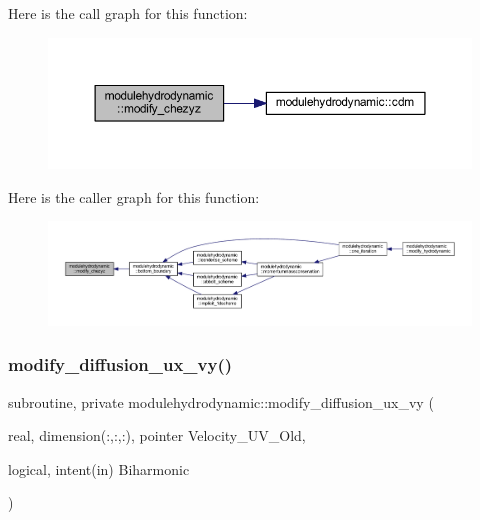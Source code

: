Here is the call graph for this function\+:\nopagebreak
\begin{figure}[H]
\begin{center}
\leavevmode
\includegraphics[width=350pt]{namespacemodulehydrodynamic_a4b8bde093197fe02063699036c456839_cgraph}
\end{center}
\end{figure}
Here is the caller graph for this function\+:\nopagebreak
\begin{figure}[H]
\begin{center}
\leavevmode
\includegraphics[width=350pt]{namespacemodulehydrodynamic_a4b8bde093197fe02063699036c456839_icgraph}
\end{center}
\end{figure}
\mbox{\label{namespacemodulehydrodynamic_a1961c3204e40bc45322afca99ce797ea}} 
\subsubsection{\texorpdfstring{modify\+\_\+diffusion\+\_\+ux\+\_\+vy()}{modify\_diffusion\_ux\_vy()}}
{\footnotesize\ttfamily subroutine, private modulehydrodynamic\+::modify\+\_\+diffusion\+\_\+ux\+\_\+vy (\begin{DoxyParamCaption}\item[{real, dimension(\+:,\+:,\+:), pointer}]{Velocity\+\_\+\+U\+V\+\_\+\+Old,  }\item[{logical, intent(in)}]{Biharmonic }\end{DoxyParamCaption})\hspace{0.3cm}{\ttfamily [private]}}


